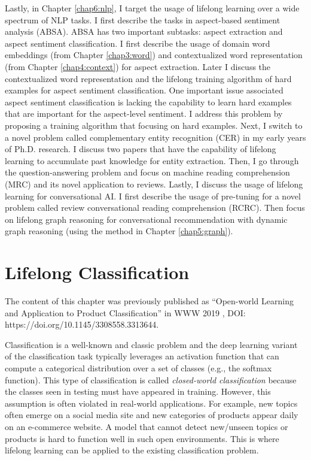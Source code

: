 Lastly, in Chapter \ref{chap6:nlp}, I target the usage of lifelong learning over a wide spectrum of NLP tasks.
I first describe the tasks in aspect-based sentiment analysis (ABSA).
ABSA has two important subtasks: aspect extraction and aspect sentiment classification. 
I first describe the usage of domain word embeddings (from Chapter \ref{chap3:word}) and contextualized word representation (from Chapter \ref{chap4:context}) for aspect extraction.
Later I discuss the contextualized word representation and the lifelong training algorithm of hard examples for aspect sentiment classification.
One important issue associated aspect sentiment classification is lacking the capability to learn hard examples that are important for the aspect-level sentiment.
I address this problem by proposing a training algorithm that focusing on hard examples.
Next, I switch to a novel problem called complementary entity recognition (CER) in my early years of Ph.D. research.
I discuss two papers that have the capability of lifelong learning to accumulate past knowledge for entity extraction.
Then, I go through the question-answering problem and focus on machine reading comprehension (MRC) and its novel application to reviews.
Lastly, I discuss the usage of lifelong learning for conversational AI. 
I first describe the usage of pre-tuning for a novel problem called review conversational reading comprehension (RCRC).
Then focus on lifelong graph reasoning for conversational recommendation with dynamic graph reasoning (using the method in Chapter \ref{chap5:graph}).

\chapter{Lifelong Classification}
\label{chap2:open}

The content of this chapter was previously published as ``Open-world Learning and Application to Product Classification'' in WWW 2019 \cite{xu2019open}, DOI: https://doi.org/10.1145/3308558.3313644.

Classification is a well-known and classic problem and the deep learning variant of the classification task typically leverages an activation function that can compute a categorical distribution over a set of classes (e.g., the softmax function).
This type of classification is called \textit{closed-world classification} because the classes seen in testing must have appeared in training. However, this assumption is often violated in real-world applications. For example, new topics often emerge on a social media site and new categories of products appear daily on an e-commerce website. 
A model that cannot detect new/unseen topics or products is hard to function well in such open environments.  
This is where lifelong learning can be applied to the existing classification problem.

